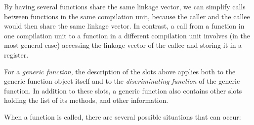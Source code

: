 By having several functions share the same linkage vector, we can
simplify calls between functions in the same compilation unit, because
the caller and the callee would then share the same linkage vector.
In contrast, a call from a function in one compilation unit to a
function in a different compilation unit involves (in the most general
case) accessing the linkage vector of the callee and storing it in a
register.

For a \emph{generic function}, the description of the slots above
applies both to the generic function object itself and to the
\emph{discriminating function} of the generic function.  In addition
to these slots, a generic function also contains other slots holding
the list of its methods, and other information.

When a function is called, there are several possible situations that
can occur:

